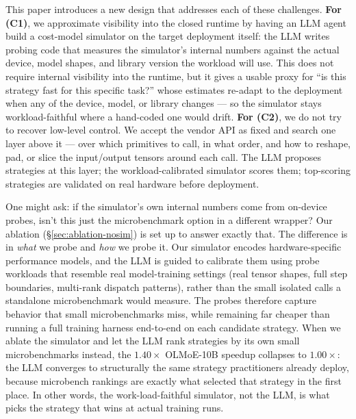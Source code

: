 This paper introduces a new design that addresses each of
these challenges.
\textbf{For (C1)}, we approximate visibility into the closed
runtime by having an LLM agent build a cost-model simulator
on the target deployment itself: the LLM writes probing code
that measures the simulator's internal numbers against the
actual device, model shapes, and library version the workload
will use. This does not require internal visibility into the
runtime, but it gives a usable proxy for ``is this strategy
fast for this specific task?'' whose estimates re-adapt to the
deployment when any of the device, model, or library changes
--- so the simulator stays workload-faithful where a
hand-coded one would drift.
\textbf{For (C2)}, we do not try to recover low-level control.
We accept the vendor API as fixed and search one layer above
it --- over which primitives to call, in what order, and how
to reshape, pad, or slice the input/output tensors around each
call. The LLM proposes strategies at this layer; the
workload-calibrated simulator scores them; top-scoring
strategies are validated on real hardware before deployment.

One might ask: if the simulator's own internal numbers come
from on-device probes, isn't this just the microbenchmark
option in a different wrapper? Our ablation
(\S\ref{sec:ablation-nosim}) is set up to answer exactly that.
The difference is in \emph{what} we probe and \emph{how} we
probe it. Our simulator encodes hardware-specific performance
models, and the LLM is guided to calibrate them using probe
workloads that resemble real model-training settings (real
tensor shapes, full step boundaries, multi-rank dispatch
patterns), rather than the small isolated calls a standalone
microbenchmark would measure. The probes therefore capture
behavior that small microbenchmarks miss, while remaining far
cheaper than running a full training harness end-to-end on
each candidate strategy. When we ablate the simulator and let
the LLM rank strategies by its own small microbenchmarks
instead, the $1.40\times$ OLMoE-10B speedup collapses to
$1.00\times$: the LLM converges to structurally the same
strategy practitioners already deploy, because microbench
rankings are exactly what selected that strategy in the first
place. In other words, the work-load-faithful simulator, not
the LLM, is what picks the strategy that wins at actual
training runs.


